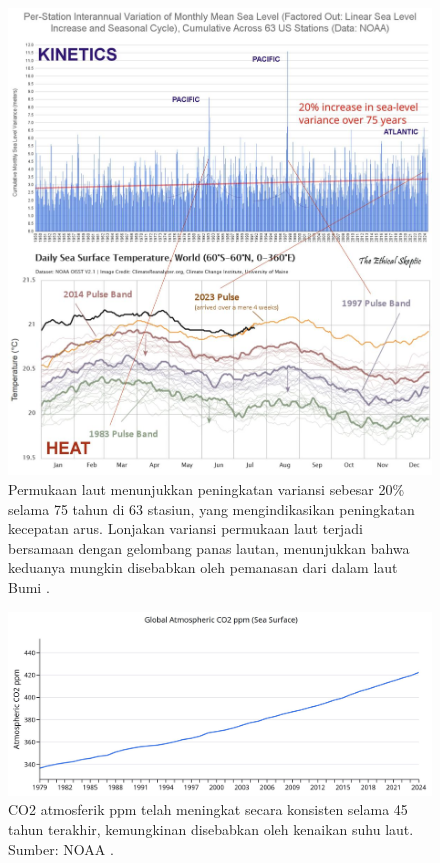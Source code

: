 \documentclass[10pt,twocolumn,letterpaper]{article}
\begin{document}
\begin{figure}[t]
\begin{center}
\includegraphics[width=1\textwidth]{sealevel.jpeg}
\end{center}
   \caption{Permukaan laut menunjukkan peningkatan variansi sebesar 20\% selama 75 tahun di 63 stasiun, yang mengindikasikan peningkatan kecepatan arus. Lonjakan variansi permukaan laut terjadi bersamaan dengan gelombang panas lautan, menunjukkan bahwa keduanya mungkin disebabkan oleh pemanasan dari dalam laut Bumi \cite{2,129}.}
\label{fig:22}
\end{figure}

\begin{figure}[t]
\begin{center}
\includegraphics[width=1\textwidth]{co2.jpg}
\end{center}
   \caption{CO2 atmosferik ppm telah meningkat secara konsisten selama 45 tahun terakhir, kemungkinan disebabkan oleh kenaikan suhu laut. Sumber: NOAA \cite{148,129}.}
\label{fig:23}
\end{figure}
\end{document}
